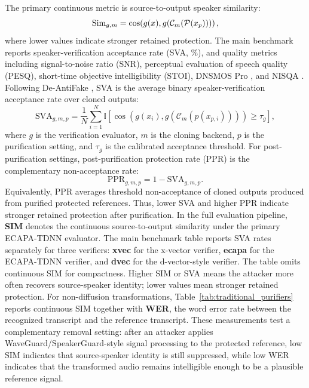 The primary continuous metric is source-to-output speaker similarity:
\begin{equation}
    \mathrm{Sim}_{g,m}
    =
    \cos\!\left(g(x), g(\mathcal{C}_m(\mathcal{P}(x_p)))\right),
\end{equation}
where lower values indicate stronger retained protection. The main benchmark reports speaker-verification acceptance rate (SVA, \%), 
and quality metrics including signal-to-noise ratio (SNR), perceptual evaluation of speech quality (PESQ), short-time objective intelligibility (STOI), DNSMOS Pro \cite{cumlin24_interspeech}, and NISQA \cite{mittag2021nisqa}. 
Following De-AntiFake \cite{fan2025deantifake}, SVA is the average binary speaker-verification acceptance rate over cloned outputs:
\begin{equation}
    \mathrm{SVA}_{g,m,p}
    =
    \frac{1}{N}\sum_{i=1}^{N}
    \mathbb{I}\!\left[
        \cos\!\left(g(x_i), g(\mathcal{C}_m(p(x_{p,i})))\right)
        \ge \tau_g
    \right],
\end{equation}
where $g$ is the verification evaluator, $m$ is the cloning backend, $p$ is the purification setting, and $\tau_g$ is the calibrated acceptance threshold. 
For post-purification settings, post-purification protection rate (PPR) is the complementary non-acceptance rate:
\begin{equation}
    \mathrm{PPR}_{g,m,p}=1-\mathrm{SVA}_{g,m,p}.
\end{equation}
Equivalently, PPR averages threshold non-acceptance of cloned outputs produced from purified protected references. Thus, lower SVA and higher PPR indicate stronger retained protection after purification.
In the full evaluation pipeline, \textbf{SIM} denotes the continuous source-to-output similarity under the primary ECAPA-TDNN evaluator. 
The main benchmark table reports SVA rates separately for three verifiers: \textbf{xvec} for the x-vector verifier, \textbf{ecapa} for the ECAPA-TDNN verifier, and \textbf{dvec} for the d-vector-style verifier. The table omits continuous SIM for compactness. 
Higher SIM or SVA means the attacker more often recovers source-speaker identity; lower values mean stronger retained protection.
For non-diffusion transformations, Table~\ref{tab:traditional_purifiers} reports continuous SIM together with \textbf{WER}, the word error rate between the recognized transcript and the reference transcript. 
These measurements test a complementary removal setting: after an attacker applies WaveGuard/SpeakerGuard-style signal processing to the protected reference, low SIM indicates that source-speaker identity is still suppressed, while low WER indicates that the transformed audio remains intelligible enough to be a plausible reference signal. 
